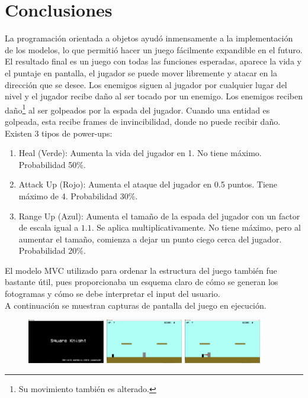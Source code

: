\documentclass[letterpaper,11pt]{article} %
\begin{document}
\section{Conclusiones}
	La programación orientada a objetos ayudó inmensamente a la implementación de los modelos, lo que permitió hacer un juego fácilmente expandible en el futuro. El resultado final es un juego con todas las funciones esperadas, aparece la vida y el puntaje en pantalla, el jugador se puede mover libremente y atacar en la dirección que se desee. Los enemigos siguen al jugador por cualquier lugar del nivel y el jugador recibe daño al ser tocado por un enemigo. Los enemigos reciben daño\footnote{Su movimiento también es alterado.} al ser golpeados por la espada del jugador. Cuando una entidad es golpeada, esta recibe frames de invincibilidad, donde no puede recibir daño. Existen 3 tipos de power-ups:
	\begin{enumerate}
		\item Heal (Verde):
		Aumenta la vida del jugador en 1. No tiene máximo. Probabilidad 50\%.
		\item Attack Up (Rojo):
		Aumenta el ataque del jugador en 0.5 puntos. Tiene máximo de 4. Probabilidad 30\%.
		\item Range Up (Azul):
		Aumenta el tamaño de la espada del jugador con un factor de escala igual a $1.1$. Se aplica multiplicativamente. No tiene máximo, pero al aumentar el tamaño, comienza a dejar un punto ciego cerca del jugador. Probabilidad 20\%.
	\end{enumerate}

	El modelo MVC utilizado para ordenar la estructura del juego también fue bastante útil, pues proporcionaba un esquema claro de cómo se generan los fotogramas y cómo se debe interpretar el input del usuario.\\

	A continuación se muestran capturas de pantalla del juego en ejecución.

	\begin{figure}[H]
		\centering
		\includegraphics[width=0.30\textwidth]{images/screencap_01}
		\hfill
		\includegraphics[width=0.30\textwidth]{images/screencap_02}
		\hfill
		\includegraphics[width=0.30\textwidth]{images/screencap_03}
	\end{figure}
\end{document}
